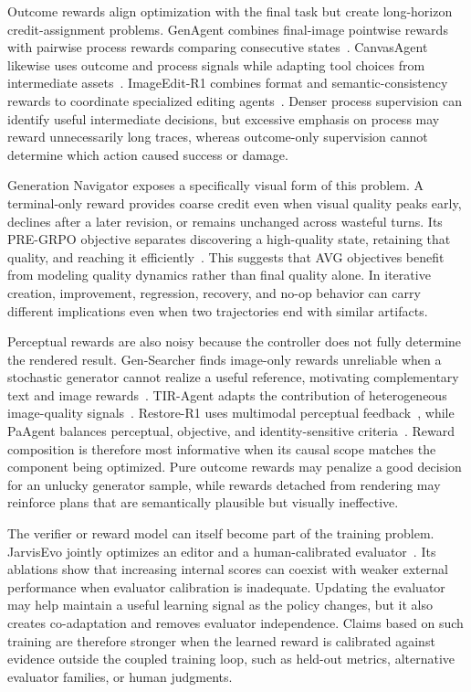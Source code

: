 Outcome rewards align optimization with the final task but create long-horizon credit-assignment problems. GenAgent combines final-image pointwise rewards with pairwise process rewards comparing consecutive states~\cite{jiang2026genagent}. CanvasAgent likewise uses outcome and process signals while adapting tool choices from intermediate assets~\cite{avg260705465}. ImageEdit-R1 combines format and semantic-consistency rewards to coordinate specialized editing agents~\cite{avg260308059}. Denser process supervision can identify useful intermediate decisions, but excessive emphasis on process may reward unnecessarily long traces, whereas outcome-only supervision cannot determine which action caused success or damage.

Generation Navigator exposes a specifically visual form of this problem. A terminal-only reward provides coarse credit even when visual quality peaks early, declines after a later revision, or remains unchanged across wasteful turns. Its PRE-GRPO objective separates discovering a high-quality state, retaining that quality, and reaching it efficiently~\cite{avg260517969}. This suggests that AVG objectives benefit from modeling quality dynamics rather than final quality alone. In iterative creation, improvement, regression, recovery, and no-op behavior can carry different implications even when two trajectories end with similar artifacts.

Perceptual rewards are also noisy because the controller does not fully determine the rendered result. Gen-Searcher finds image-only rewards unreliable when a stochastic generator cannot realize a useful reference, motivating complementary text and image rewards~\cite{avg260328767}. TIR-Agent adapts the contribution of heterogeneous image-quality signals~\cite{avg260327742}. Restore-R1 uses multimodal perceptual feedback~\cite{avg251218599}, while PaAgent balances perceptual, objective, and identity-sensitive criteria~\cite{avg260317055}. Reward composition is therefore most informative when its causal scope matches the component being optimized. Pure outcome rewards may penalize a good decision for an unlucky generator sample, while rewards detached from rendering may reinforce plans that are semantically plausible but visually ineffective.

The verifier or reward model can itself become part of the training problem. JarvisEvo jointly optimizes an editor and a human-calibrated evaluator~\cite{avg251123002}. Its ablations show that increasing internal scores can coexist with weaker external performance when evaluator calibration is inadequate. Updating the evaluator may help maintain a useful learning signal as the policy changes, but it also creates co-adaptation and removes evaluator independence. Claims based on such training are therefore stronger when the learned reward is calibrated against evidence outside the coupled training loop, such as held-out metrics, alternative evaluator families, or human judgments.

